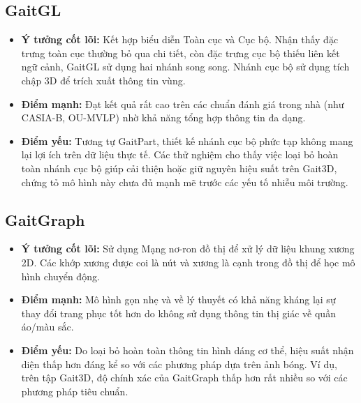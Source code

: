 \subsection{GaitGL \cite{lin2021gait}}
\begin{itemize}
  \item \textbf{Ý tưởng cốt lõi:}
        Kết hợp biểu diễn Toàn cục và Cục bộ. Nhận thấy đặc trưng toàn cục thường bỏ qua chi tiết, còn đặc trưng cục bộ thiếu liên kết ngữ cảnh, GaitGL sử dụng hai nhánh song song. Nhánh cục bộ sử dụng tích chập 3D để trích xuất thông tin vùng.

  \item \textbf{Điểm mạnh:}
        Đạt kết quả rất cao trên các chuẩn đánh giá trong nhà (như CASIA-B, OU-MVLP) nhờ khả năng tổng hợp thông tin đa dạng.

  \item \textbf{Điểm yếu:}
        Tương tự GaitPart, thiết kế nhánh cục bộ phức tạp không mang lại lợi ích trên dữ liệu thực tế. Các thử nghiệm cho thấy việc loại bỏ hoàn toàn nhánh cục bộ giúp cải thiện hoặc giữ nguyên hiệu suất trên Gait3D, chứng tỏ mô hình này chưa đủ mạnh mẽ trước các yếu tố nhiễu môi trường.
\end{itemize}

\subsection{GaitGraph \cite{teepe2021gaitgraph}}
\begin{itemize}
  \item \textbf{Ý tưởng cốt lõi:}
        Sử dụng Mạng nơ-ron đồ thị để xử lý dữ liệu khung xương 2D. Các khớp xương được coi là nút và xương là cạnh trong đồ thị để học mô hình chuyển động.

  \item \textbf{Điểm mạnh:}
        Mô hình gọn nhẹ và về lý thuyết có khả năng kháng lại sự thay đổi trang phục tốt hơn do không sử dụng thông tin thị giác về quần áo/màu sắc.

  \item \textbf{Điểm yếu:}
        Do loại bỏ hoàn toàn thông tin hình dáng cơ thể, hiệu suất nhận diện thấp hơn đáng kể so với các phương pháp dựa trên ảnh bóng. Ví dụ, trên tập Gait3D, độ chính xác của GaitGraph thấp hơn rất nhiều so với các phương pháp tiêu chuẩn.
\end{itemize}

